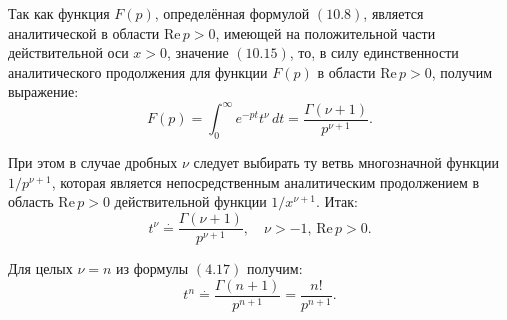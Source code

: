 {Так как функция \(F(p)\), определённая формулой \((10.8)\), является аналитической в области \(\text{Re} \, p > 0\), имеющей на положительной части действительной оси \(x > 0\), значение \((10.15)\), то, в силу единственности аналитического продолжения для функции \(F(p)\) в области \(\text{Re} \, p > 0\), получим выражение:
\[
F(p) = \int_{0}^{\infty} e^{-pt} t^\nu \, dt = \frac{\Gamma(\nu + 1)}{p^{\nu+1}}. \tag{104.16}
\]

При этом в случае дробных \(\nu\) следует выбирать ту ветвь многозначной функции \(1/p^{\nu+1}\), которая является непосредственным аналитическим продолжением в область \(\text{Re} \, p > 0\) действительной функции \(1/x^{\nu+1}\). Итак:
\[
t^\nu \overset{\cdot}{=} \frac{\Gamma(\nu + 1)}{p^{\nu+1}}, \quad \nu > -1, \, \text{Re} \, p > 0. \tag{4.17}
\]

Для целых \(\nu = n\) из формулы \((4.17)\) получим:
\[
t^n \overset{\cdot}{=} \frac{\Gamma(n + 1)}{p^{n+1}} = \frac{n!}{p^{n+1}}. \tag{4.18}
\]
}



